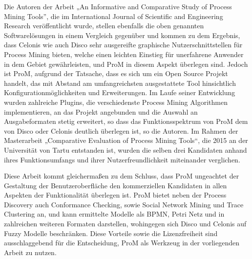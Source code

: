 Die Autoren der Arbeit „An Informative and Comparative Study of Process Mining Tools”, die im International Journal of Scientific and Engineering Research veröffentlicht wurde, stellen ebenfalls die oben genannten Softwarelösungen in einem Vergleich gegenüber und kommen zu dem Ergebnis, dass Celonis wie auch Disco sehr ausgereifte graphische Nutzerschnittstellen für Process Mining bieten, welche einen leichten Einstieg für unerfahrene Anwender in dem Gebiet gewährleisten, und ProM in diesem Aspekt überlegen sind. Jedoch ist ProM, aufgrund der Tatsache, dass es sich um ein Open Source Projekt handelt, das mit Abstand am umfangreichsten ausgestattete Tool hinsichtlich Konfigurationmöglichkeiten und Erweiterungen. Im Laufe seiner Entwicklung wurden zahlreiche Plugins, die verschiedenste Process Mining Algorithmen implementieren, an das Projekt angebunden und die Auswahl an Ausgabeformaten stetig erweitert, so dass das Funktionsspektrum von ProM dem von Disco oder Celonis deutlich überlegen ist, so die Autoren. Im Rahmen der Masterarbeit „Comparative Evaluation of Process Mining Tools“, die 2015 an der Universität von Tartu \cite{ComparativeEO} entstanden ist, wurden die selben drei Kandidaten anhand ihres Funktionsumfangs und ihrer Nutzerfreundlichkeit miteinander verglichen.

\begin{table}[!h]
\centering
{}
\caption{Auszug aus Tabelle 4.9 aus „Comparative Evaluation of Process Mining Tools“\cite{ComparativeEO}}
\label{comparison2}
\end{table}

Diese Arbeit kommt gleichermaßen zu dem Schluss, dass ProM ungeachtet der Gestaltung der Benutzeroberfläche den kommerziellen Kandidaten in allen Aspekten der Funktionalität überlegen ist. ProM bietet neben der Process Discovery auch Conformance Checking, sowie Social Network Mining und Trace Clustering an, und kann ermittelte Modelle als BPMN, Petri Netz und in zahlreichen weiteren Formaten darstellen, wohingegen sich Disco und Celonis auf Fuzzy Modelle beschränken. Diese Vorteile sowie die Lizenzfreiheit sind ausschlaggebend für die Entscheidung, ProM als Werkzeug in der vorliegenden Arbeit zu nutzen. 


